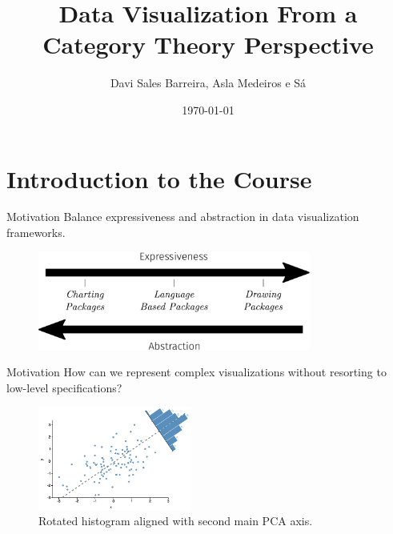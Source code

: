\documentclass[aspectratio=169,xcolor=dvipsnames,10pt]{beamer}
\title{Data Visualization From a Category Theory Perspective}
\subtitle{}
\author{Davi Sales Barreira, Asla Medeiros e Sá}
\institute
{
    FGV - EMAp, IMPATech
}
\date{\today} %
\theoremstyle{definition}
\begin{document}
\begin{frame}
    \titlepage
\end{frame}

\section{Introduction to the Course}
\begin{frame}[fragile]{Motivation}
  Balance expressiveness and abstraction in data visualization
  frameworks.
	\vspace{3mm}
	\begin{figure}[H]
		\begin{center}
			\includegraphics[width=0.8\textwidth]{./figures/expressiveness.pdf}
		\end{center}
		\label{fig:rotated-histogram}
	\end{figure}
\end{frame}

\begin{frame}[fragile]{Motivation}
    How can we represent complex visualizations without resorting to low-level specifications?
	\vspace{3mm}
	\begin{figure}[H]
		\begin{center}
			\includegraphics[width=0.45\textwidth]{./figs/pca.pdf}
		\end{center}
        \caption{Rotated histogram aligned with second main PCA axis.}
		\label{fig:rotated-histogram}
	\end{figure}
\end{frame}
\end{document}
